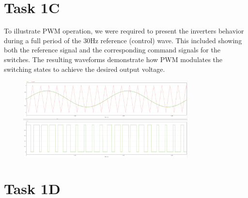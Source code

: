 \documentclass[12pt,a4paper]{report}
\begin{document}
\section{Task 1C}
\label{sec:task-1c}

To illustrate PWM operation, we were required to present the inverters behavior during a full period of the 30Hz reference (control) wave.
This included showing both the reference signal and the corresponding command signals for the switches.
The resulting waveforms demonstrate how PWM modulates the switching states to achieve the desired output voltage.

\begin{figure}[H]
    \centering
    \includegraphics[width=0.8\textwidth]{2Y30Hz.png}
    \label{fig:pwm30hz}

\end{figure}

\section{Task 1D}
\label{sec:task-1d}
\end{document}
